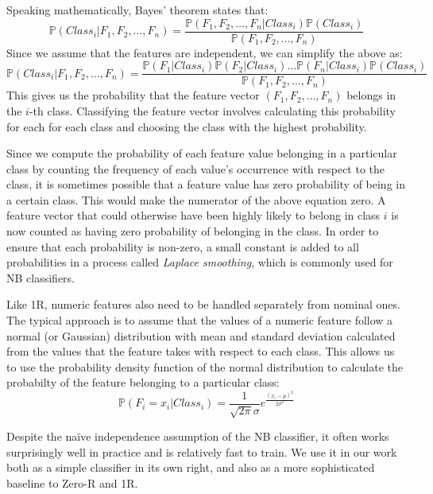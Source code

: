 Speaking mathematically, Bayes' theorem states that:
\begin{equation*}
\mathbb{P}(Class_i|F_1,F_2,\ldots,F_n) =
  \dfrac{\mathbb{P}(F_1,F_2,\ldots,F_n|Class_i)\mathbb{P}(Class_i)}{\mathbb{P}(F_1,F_2,\ldots,F_n)}
\end{equation*}
Since we assume that the features are independent, we can simplify the above as:
\begin{equation*}
\mathbb{P}(Class_i|F_1,F_2,\ldots,F_n) =
\dfrac{\mathbb{P}(F_1|Class_i)\mathbb{P}(F_2|Class_i)\ldots \mathbb{P}(F_n|Class_i)\mathbb{P}(Class_i)}{\mathbb{P}(F_1,F_2,\ldots,F_n)}
\end{equation*}
This gives us the probability that the feature vector $(F_1,F_2,\ldots,F_n)$
belongs in the $i$-th class. Classifying the feature vector involves
calculating this probability for each for each class and choosing the class
with the highest probability.

Since we compute the probability of each feature value belonging in a
particular class by counting the frequency of each value's occurrence with
respect to the class, it is sometimes possible that a feature value has zero
probability of being in a certain class. This would make the numerator of the
above equation zero. A feature vector that could otherwise have been highly
likely to belong in class $i$ is now counted as having zero probability of
belonging in the class. In order to ensure that each probability is non-zero,
a small constant is added to all probabilities in a process called
\textit{Laplace smoothing}, which is commonly used for NB classifiers.

Like 1R, numeric features also need to be handled separately from nominal ones.
The typical approach is to assume that the values of a numeric feature follow a
normal (or Gaussian) distribution with mean and standard deviation calculated
from the values that the feature takes with respect to each class.
This allows us to use the probability
density function of the normal distribution to calculate the probabilty of the
feature belonging to a particular class:
\begin{equation*}
\mathbb{P}(F_i=x_i|Class_i) =
  \dfrac{1}{\sqrt{2\pi}\sigma}e^\frac{(x_i-\mu)^2}{2\sigma^2}
\end{equation*}

Despite the na\"{i}ve independence assumption of the NB classifier, it often
works surprisingly well in practice and is relatively fast to train. We use it
in our work both as a simple classifier in its own right, and also as a more
sophisticated baseline to Zero-R and 1R.

